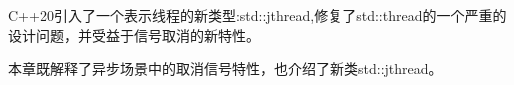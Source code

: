 C++20引入了一个表示线程的新类型:std::jthread,修复了std::thread的一个严重的设计问题，并受益于信号取消的新特性。

本章既解释了异步场景中的取消信号特性，也介绍了新类std::jthread。